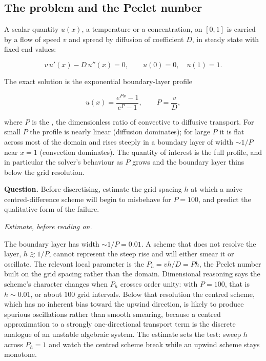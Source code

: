 \subsection{The problem and the Peclet number}

A scalar quantity $u(x)$, a temperature or a concentration, on $[0, 1]$ is
carried by a flow of speed $v$ and spread by diffusion of coefficient $D$,
in steady state with fixed end values:

\[
v\, u'(x) - D\, u''(x) = 0, \qquad u(0) = 0, \quad u(1) = 1.
\]

The exact solution is the exponential boundary-layer profile

\[
u(x) = \frac{e^{P x} - 1}{e^{P} - 1}, \qquad P = \frac{v}{D},
\]

where $P$ is the , the dimensionless ratio of
convective to diffusive transport. For small $P$ the profile is nearly
linear (diffusion dominates); for large $P$ it is flat across most of the
domain and rises steeply in a boundary layer of width $\sim 1/P$ near
$x = 1$ (convection dominates). The quantity of interest is the full profile,
and in particular the solver's behaviour as $P$ grows and the boundary layer
thins below the grid resolution.

\begin{estimation}
\textbf{Question.} Before discretising, estimate the grid spacing $h$ at
which a naive centred-difference scheme will begin to misbehave for
$P = 100$, and predict the qualitative form of the failure.

\smallskip
\textit{Estimate, before reading on.}

\smallskip
The boundary layer has width $\sim 1/P = 0.01$. A scheme that does not
resolve the layer, $h \gtrsim 1/P$, cannot represent the steep rise and will
either smear it or oscillate. The relevant local parameter is the
 $P_{h} = v h / D = P h$, the Peclet number
built on the grid spacing rather than the domain. Dimensional reasoning says
the scheme's character changes when $P_{h}$ crosses order unity: with $P =
100$, that is $h \sim 0.01$, or about $100$ grid intervals. Below that
resolution the centred scheme, which has no inherent bias toward the upwind
direction, is likely to produce spurious oscillations rather than smooth
smearing, because a centred approximation to a strongly one-directional
transport term is the discrete analogue of an unstable algebraic system. The
estimate sets the test: sweep $h$ across $P_{h} = 1$ and watch the centred
scheme break while an upwind scheme stays monotone.
\end{estimation}

